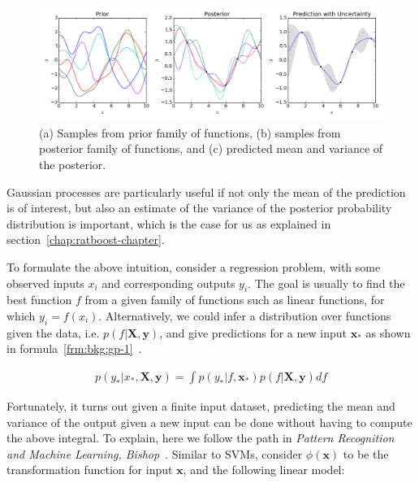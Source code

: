 \begin{figure}[!ht]
  \centering
  \includegraphics[width=1\textwidth]{figs/background/Gaussian_Process_Regression}
  \caption[(a) Samples from prior family of functions, (b) samples from posterior family of functions, and (c) predicted mean and variance]{(a) Samples from prior family of functions, (b) samples from posterior family of functions, and (c) predicted mean and variance of the posterior\protect\footnotemark.}
  \label{fig:bkg:gp-intro}
\end{figure}

Gaussian processes are particularly useful if not only the mean of the prediction is of interest, but also an estimate of the variance of the posterior probability distribution is important, which is the case for us as explained in section~\ref{chap:ratboost-chapter}.

To formulate the above intuition, consider a regression problem, with some observed inputs $x_i$ and corresponding outputs $y_i$. The goal is usually to find the best function $f$ from a given family of functions such as linear functions, for which $y_i = f(x_i)$. Alternatively, we could infer a distribution over functions given the data, i.e. $p(f|\mathbf{X}, \mathbf{y})$, and give predictions for a new input $\mathbf{x}_*$ as shown in formula~\ref{frm:bkg:gp-1}~\cite{murphy2012machine}.

\begin{align}
  p(y_*|x_*,\mathbf{X}, \mathbf{y}) = \int p(y_*|f, \mathbf{x_*})p(f|\mathbf{X}, \mathbf{y})df
  \label{frm:bkg:gp-1}
\end{align}

Fortunately, it turns out given a finite input dataset, predicting the mean and variance of the output given a new input can be done without having to compute the above integral. To explain, here we follow the path in \emph{Pattern Recognition and Machine Learning, Bishop}~\cite{bishop2006pattern}. Similar to SVMs, consider $\phi(\mathbf{x})$ to be the transformation function for input $\mathbf{x}$, and the following linear model:

